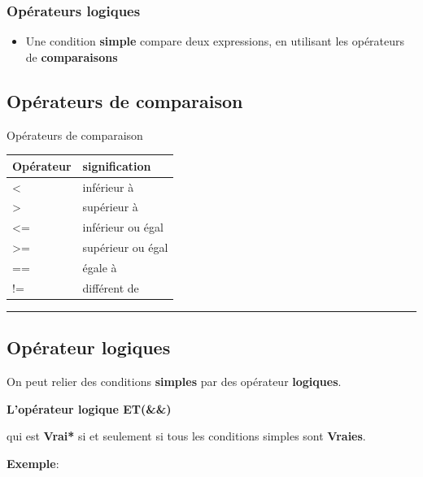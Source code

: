 \documentclass[letterpaper,10pt,english]{sphinxmanual}
\begin{document}
\subsubsection{Opérateurs logiques}
\label{structures1:operateurs-logiques}\begin{itemize}
\item {} 
Une condition \textbf{simple} compare deux expressions, en utilisant les opérateurs de \textbf{comparaisons}

\end{itemize}


\subsection{Opérateurs de comparaison}
\label{structures1:operateurs-de-comparaison}

\begin{threeparttable}
\capstart\caption{Opérateurs de comparaison}

\begin{tabulary}{\linewidth}{|L|L|}
\hline
\textsf{\relax 
Opérateur
} & \textsf{\relax 
signification
}\\
\hline
\textless{}
 & 
inférieur à
\\
\hline
\textgreater{}
 & 
supérieur à
\\
\hline
\textless{}=
 & 
inférieur ou égal
\\
\hline
\textgreater{}=
 & 
supérieur ou égal
\\
\hline
==
 & 
égale à
\\
\hline
!=
 & 
différent de
\\
\hline\end{tabulary}

\end{threeparttable}



\bigskip\hrule{}\bigskip



\subsection{Opérateur logiques}
\label{structures1:operateur-logiques}
On peut relier des conditions \textbf{simples} par des opérateur \textbf{logiques}.

\textbf{L'opérateur logique ET(\&\&)}

qui est \textbf{Vrai*} si et seulement si tous les conditions simples sont \textbf{Vraies}.

\textbf{Exemple}:
\end{document}
